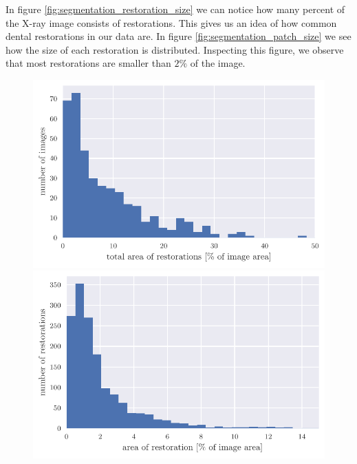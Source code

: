 In figure \ref{fig:segmentation_restoration_size} we can  notice how many percent of the X-ray image consists of restorations. This gives us an idea of how common dental restorations in our data are. In figure \ref{fig:segmentation_patch_size} we see how the size of each restoration is distributed. Inspecting this figure, we observe that most restorations are smaller than $2\%$ of the image.

\begin{figure}
    \centering
    \begin{floatrow}[2]
        {\includegraphics[width=\linewidth]{images/histogram_of_restoration_size.pdf}}\;
        {\includegraphics[width=\linewidth]{images/histogram_of_patch_size.pdf}}
    \end{floatrow}
\end{figure}